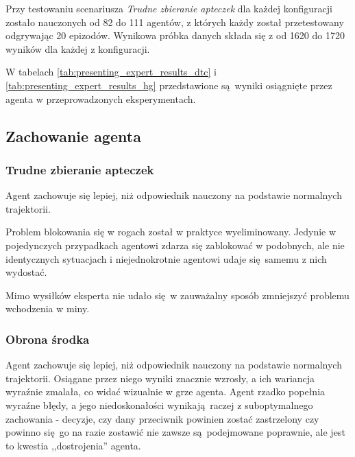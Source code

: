 Przy testowaniu scenariusza \textit{Trudne zbieranie apteczek} dla każdej konfiguracji zostało nauczonych od 82 do 111 agentów, z których każdy został przetestowany odgrywając 20 epizodów. Wynikowa próbka danych składa się z od 1620 do 1720 wyników dla każdej z konfiguracji.

W tabelach \ref{tab:presenting_expert_results_dtc} i \ref{tab:presenting_expert_results_hg} przedstawione są wyniki osiągnięte przez agenta w przeprowadzonych eksperymentach.

\begin{figure}[H]
\end{figure}

\begin{figure}[H]
\end{figure}


\subsection{Zachowanie agenta}
\subsubsection{Trudne zbieranie apteczek}
Agent zachowuje się lepiej, niż odpowiednik nauczony na podstawie normalnych trajektorii.

Problem blokowania się w rogach został w praktyce wyeliminowany. Jedynie w pojedynczych przypadkach agentowi zdarza się zablokować w podobnych, ale nie identycznych sytuacjach i niejednokrotnie agentowi udaje się samemu z nich wydostać.

Mimo wysiłków eksperta nie udało się w zauważalny sposób zmniejszyć problemu wchodzenia w miny.

\subsubsection{Obrona środka}
Agent zachowuje się lepiej, niż odpowiednik nauczony na podstawie normalnych trajektorii.
Osiągane przez niego wyniki znacznie wzrosły, a ich wariancja wyraźnie zmalała, co widać wizualnie w grze agenta. Agent rzadko popełnia wyraźne błędy, a jego niedoskonałości wynikają raczej z suboptymalnego zachowania - decyzje, czy dany przeciwnik powinien zostać zastrzelony czy powinno się go na razie zostawić nie zawsze są podejmowane poprawnie, ale jest to kwestia ,,dostrojenia'' agenta.

